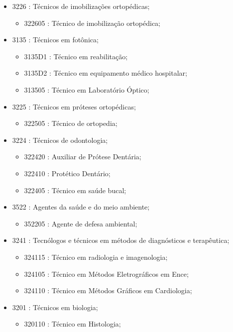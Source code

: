 \begin{itemize}
\begin{itemize}
    \item 3226 : Técnicos de imobilizações ortopédicas;
    \begin{itemize}
      \item 322605 : Técnico de imobilização ortopédica;
    \end{itemize}
    \item 3135 : Técnicos em fotônica;
    \begin{itemize}
      \item 3135D1 : Técnico em reabilitação;
      \item 3135D2 : Técnico em equipamento médico hospitalar;
      \item 313505 : Técnico em Laboratório Óptico;
    \end{itemize}
    \item 3225 : Técnicos em próteses ortopédicas;
    \begin{itemize}
      \item 322505 : Técnico de ortopedia;
    \end{itemize}
    \item 3224 : Técnicos de odontologia;
    \begin{itemize}
      \item 322420 : Auxiliar de Prótese Dentária;
      \item 322410 : Protético Dentário;
      \item 322405 : Técnico em saúde bucal;
    \end{itemize}
    \item 3522 : Agentes da saúde e do meio ambiente;
    \begin{itemize}
      \item 352205 : Agente de defesa ambiental;
    \end{itemize}
    \item 3241 : Tecnólogos e técnicos em métodos de diagnósticos e terapêutica;
    \begin{itemize}
      \item 324115 : Técnico em radiologia e imagenologia;
      \item 324105 : Técnico em Métodos Eletrográficos em Ence;
      \item 324110 : Técnico em Métodos Gráficos em Cardiologia;
    \end{itemize}
    \item 3201 : Técnicos em biologia;
    \begin{itemize}
      \item 320110 : Técnico em Histologia;

\end{itemize}
\end{itemize}
\end{itemize}
